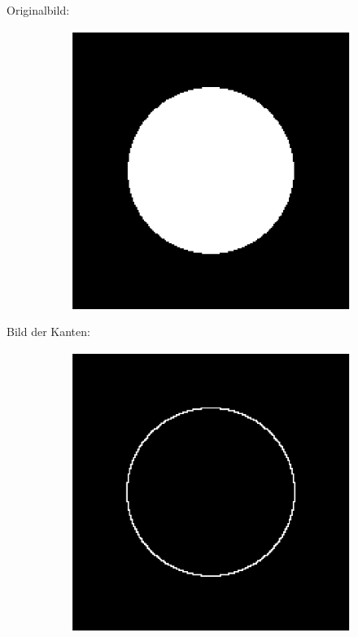 \documentclass{article}
\begin{document}
	Originalbild:
	\begin{figure}[H]
	  \begin{subfigure}
	    \centering
	    \includegraphics[scale=0.75]{task3b-original.eps}
	  \end{subfigure}
	\end{figure}
	
	Bild der Kanten:
	\begin{figure}[H]
	  \begin{subfigure}
	    \centering
	    \includegraphics[scale=0.75]{task3b-contours.eps}
	  \end{subfigure}
	\end{figure}
	
\end{document}
